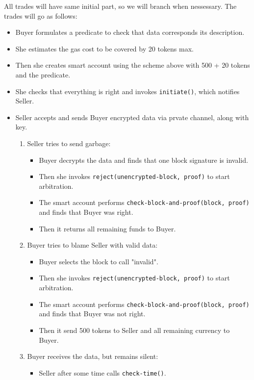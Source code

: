 All trades will have same initial part, so we will branch when nessessary.
The trades will go as follows:
\begin{itemize}
  \item Buyer formulates a predicate to check that data corresponds its description.

  \item She estimates the gas cost to be covered by 20 tokens max.

  \item Then she creates smart account using the scheme above with 500 + 20 tokens and the predicate.

  \item She checks that everything is right and invokes \verb|initiate()|, which notifies Seller.

  \item Seller accepts and sends Buyer encrypted data via prvate channel, along with key.

  \begin{enumerate}
    \item Seller tries to send garbage:
      \begin{itemize}
        \item Buyer decrypts the data and finds that one block signature is invalid.

        \item Then she invokes \verb|reject(unencrypted-block, proof)| to start arbitration.

        \item The smart account performs \verb|check-block-and-proof(block, proof)| and finds that Buyer was right.

        \item Then it returns all remaining funds to Buyer.
      \end{itemize}
    \item Buyer tries to blame Seller with valid data:
      \begin{itemize}
        \item Buyer selects the block to call "invalid".

        \item Then she invokes \verb|reject(unencrypted-block, proof)| to start arbitration.

        \item The smart account performs \verb|check-block-and-proof(block, proof)| and finds that Buyer was not right.

        \item Then it send 500 tokens to Seller and all remaining currency to Buyer.
      \end{itemize}
    \item Buyer receives the data, but remains silent:
      \begin{itemize}
        \item Seller after some time calls \verb|check-time()|.


\end{itemize}
\end{enumerate}
\end{itemize}
